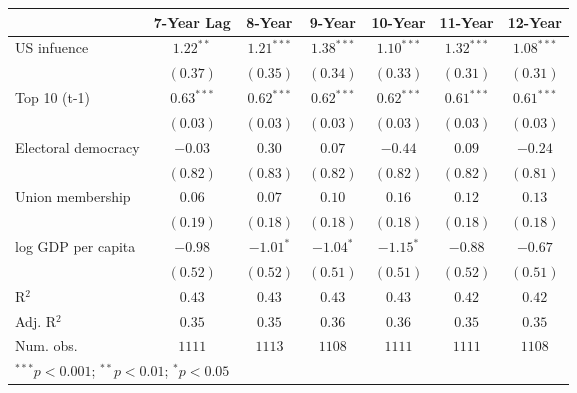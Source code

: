 
\begin{table}
\begin{center}
\begin{tabular}{l c c c c c c}
\toprule
 & 7-Year Lag & 8-Year & 9-Year & 10-Year & 11-Year & 12-Year \\
\midrule
US infuence         & $\mathbf{1.22}^{**}$  & $\mathbf{1.21}^{***}$ & $\mathbf{1.38}^{***}$ & $\mathbf{1.10}^{***}$ & $\mathbf{1.32}^{***}$ & $\mathbf{1.08}^{***}$ \\
                    & $(0.37)$              & $(0.35)$              & $(0.34)$              & $(0.33)$              & $(0.31)$              & $(0.31)$              \\
Top 10 (t-1)        & $\mathbf{0.63}^{***}$ & $\mathbf{0.62}^{***}$ & $\mathbf{0.62}^{***}$ & $\mathbf{0.62}^{***}$ & $\mathbf{0.61}^{***}$ & $\mathbf{0.61}^{***}$ \\
                    & $(0.03)$              & $(0.03)$              & $(0.03)$              & $(0.03)$              & $(0.03)$              & $(0.03)$              \\
Electoral democracy & $-0.03$               & $0.30$                & $0.07$                & $-0.44$               & $0.09$                & $-0.24$               \\
                    & $(0.82)$              & $(0.83)$              & $(0.82)$              & $(0.82)$              & $(0.82)$              & $(0.81)$              \\
Union membership    & $0.06$                & $0.07$                & $0.10$                & $0.16$                & $0.12$                & $0.13$                \\
                    & $(0.19)$              & $(0.18)$              & $(0.18)$              & $(0.18)$              & $(0.18)$              & $(0.18)$              \\
log GDP per capita  & $-0.98$               & $\mathbf{-1.01}^{*}$  & $\mathbf{-1.04}^{*}$  & $\mathbf{-1.15}^{*}$  & $-0.88$               & $-0.67$               \\
                    & $(0.52)$              & $(0.52)$              & $(0.51)$              & $(0.51)$              & $(0.52)$              & $(0.51)$              \\
\midrule
R$^2$               & $0.43$                & $0.43$                & $0.43$                & $0.43$                & $0.42$                & $0.42$                \\
Adj. R$^2$          & $0.35$                & $0.35$                & $0.36$                & $0.36$                & $0.35$                & $0.35$                \\
Num. obs.           & $1111$                & $1113$                & $1108$                & $1111$                & $1111$                & $1108$                \\
\bottomrule
\multicolumn{7}{l}{\scriptsize{$^{***}p<0.001$; $^{**}p<0.01$; $^{*}p<0.05$}}
\end{tabular}
\label{table:coefficients}
\end{center}
\end{table}
